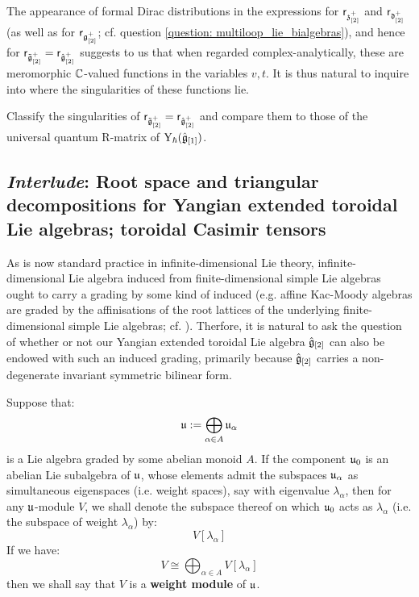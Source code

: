         \begin{remark} \label{remark: toroidal_classical_R_matrices_as_meromorphic_functions}
            The appearance of formal Dirac distributions in the expressions for $\mathsf{r}_{\mathfrak{z}_{[2]}^+}$ and $\mathsf{r}_{\mathfrak{d}_{[2]}^+}$ (as well as for $\mathsf{r}_{\mathfrak{g}_{[2]}^+}$; cf. question \ref{question: multiloop_lie_bialgebras}), and hence for $\mathsf{r}_{\tilde{\mathfrak{g}}_{[2]}^+} = \mathsf{r}_{\hat{\mathfrak{g}}_{[2]}^+}$ suggests to us that when regarded complex-analytically, these are meromorphic $\mathbb{C}$-valued functions in the variables $v, t$. It is thus natural to inquire into where the singularities of these functions lie. 
        \end{remark}
        \begin{question}
            Classify the singularities of $\mathsf{r}_{\tilde{\mathfrak{g}}_{[2]}^+} = \mathsf{r}_{\hat{\mathfrak{g}}_{[2]}^+}$ and compare them to those of the universal quantum R-matrix of $\mathrm{Y}_{\hbar}(\hat{\mathfrak{g}}_{[1]})$. 
        \end{question}

    \subsection{\textit{Interlude}: Root space and triangular decompositions for Yangian extended toroidal Lie algebras; toroidal Casimir tensors}
        As is now standard practice in infinite-dimensional Lie theory, infinite-dimensional Lie algebra induced from finite-dimensional simple Lie algebras ought to carry a grading by some kind of induced  (e.g. affine Kac-Moody algebras are graded by the affinisations of the root lattices of the underlying finite-dimensional simple Lie algebras; cf. \cite[Chapter 6]{kac_infinite_dimensional_lie_algebras}). Therfore, it is natural to ask the question of whether or not our Yangian extended toroidal Lie algebra $\hat{\mathfrak{g}}_{[2]}$ can also be endowed with such an induced grading, primarily because $\hat{\mathfrak{g}}_{[2]}$ carries a non-degenerate invariant symmetric bilinear form.  

        \begin{convention}
            Suppose that:
                $$\mathfrak{u} := \bigoplus_{\alpha \in A} \mathfrak{u}_{\alpha}$$
            is a Lie algebra graded by some abelian monoid $A$. If the component $\mathfrak{u}_0$ is an abelian Lie subalgebra of $\mathfrak{u}$, whose elements admit the subspaces $\mathfrak{u}_{\alpha}$ as simultaneous eigenspaces (i.e. weight spaces), say with eigenvalue $\lambda_{\alpha}$, then for any $\mathfrak{u}$-module $V$, we shall denote the subspace thereof on which $\mathfrak{u}_0$ acts as $\lambda_{\alpha}$ (i.e. the subspace of weight $\lambda_{\alpha}$) by:
                $$V[\lambda_{\alpha}]$$
            If we have:
                $$V \cong \bigoplus_{\alpha \in A} V[\lambda_{\alpha}]$$
            then we shall say that $V$ is a \textbf{weight module} of $\mathfrak{u}$. 
        \end{convention}

